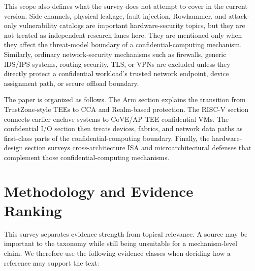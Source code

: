 \documentclass[conference]{IEEEtran}
\begin{document}
This scope also defines what the survey does not attempt to cover in the
current version. Side channels, physical leakage, fault injection, Rowhammer,
and attack-only vulnerability catalogs are important hardware-security topics,
but they are not treated as independent research lanes here. They are mentioned
only when they affect the threat-model boundary of a confidential-computing
mechanism. Similarly, ordinary network-security mechanisms such as firewalls,
generic IDS/IPS systems, routing security, TLS, or VPNs are excluded unless they
directly protect a confidential workload's trusted network endpoint, device
assignment path, or secure offload boundary.

The paper is organized as follows. The Arm section explains the transition from
TrustZone-style TEEs to CCA and Realm-based protection. The RISC-V section
connects earlier enclave systems to CoVE/AP-TEE confidential VMs. The
confidential I/O section then treats devices, fabrics, and network data paths
as first-class parts of the confidential-computing boundary. Finally, the
hardware-design section surveys cross-architecture ISA and microarchitectural
defenses that complement those confidential-computing mechanisms.

\section{Methodology and Evidence Ranking}

This survey separates evidence strength from topical relevance. A source may
be important to the taxonomy while still being unsuitable for a mechanism-level
claim. We therefore use the following evidence classes when deciding how a
reference may support the text:
\end{document}
